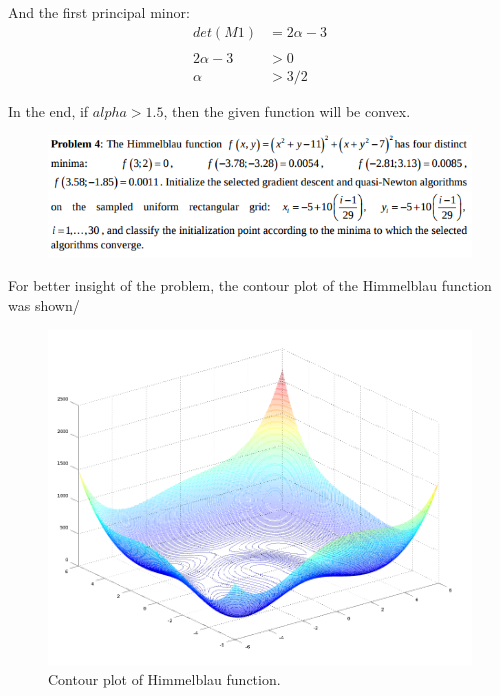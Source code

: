 \documentclass[eng,openany]{mgr}
\begin{document}
And the first principal minor:\\
\begin{align*}
det(M1) &= 2\alpha - 3\\
\\
2\alpha -3 &> 0\\
\alpha &> 3/2
\end{align*}

In the end, if $alpha > 1.5$, then the given function will be convex.
\clearpage 

\begin{figure}[h]
\centering
\includegraphics[width=0.7\linewidth]{screenshot012}
\label{fig:screenshot012}
\end{figure}

For better insight of the problem, the contour plot of the Himmelblau function was shown/
\begin{figure}[h]
\centering
\includegraphics[width=0.7\linewidth]{screenshot013}
\caption{Contour plot of Himmelblau function.}
\label{fig:screenshot013}
\end{figure}
\end{document}
